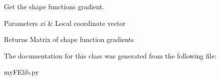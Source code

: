 Get the shape functions gradient. 


\begin{DoxyParams}{Parameters}
{\em xi} & Local coordinate vector \\
\hline
\end{DoxyParams}
\begin{DoxyReturn}{Returns}
Matrix of shape function gradients 
\end{DoxyReturn}


The documentation for this class was generated from the following file\+:\begin{DoxyCompactItemize}
\item 
my\+F\+Elib.\+py\end{DoxyCompactItemize}
